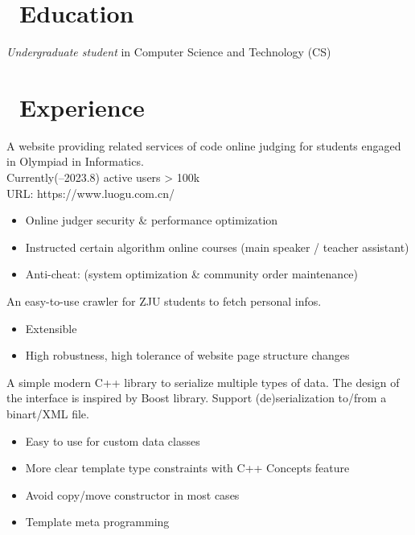 \documentclass{resume}
\begin{document}



\section{\faGraduationCap\ Education}
\textit{Undergraduate student} in Computer Science and Technology (CS)

\section{\faUsers\ Experience}
A website providing related services of code online judging for students engaged in Olympiad in Informatics. \\
Currently(--2023.8) active users > 100k \\
URL: https://www.luogu.com.cn/
\begin{itemize}
  \item Online judger security \& performance optimization
  \item Instructed certain algorithm online courses (main speaker / teacher assistant)
  \item Anti-cheat: (system optimization \& community order maintenance)
\end{itemize}

An easy-to-use crawler for ZJU students to fetch personal infos.  
\begin{itemize}
  \item Extensible
  \item High robustness, high tolerance of website page structure changes
\end{itemize}

A simple modern C++ library to serialize multiple types of data. The design of the interface is inspired by Boost library.
Support (de)serialization to/from a binart/XML file.
\begin{itemize}
  \item Easy to use for custom data classes
  \item More clear template type constraints with C++ Concepts feature
  \item Avoid copy/move constructor in most cases
  \item Template meta programming
\end{itemize}
\end{document}

